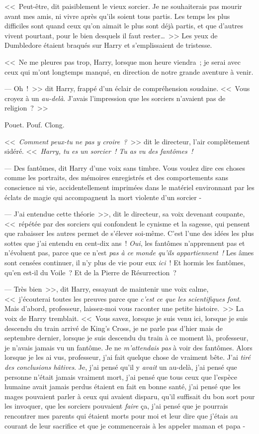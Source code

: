 <<~Peut-être, dit paisiblement le vieux sorcier. Je ne souhaiterais pas mourir avant mes amis, ni vivre après qu'ils soient tous partis. Les temps les plus difficiles sont quand ceux qu'on aimait le plus sont déjà partis, et que d'autres vivent pourtant, pour le bien desquels il faut rester…~>> Les yeux de Dumbledore étaient braqués sur Harry et s'emplissaient de tristesse.

<<~Ne me pleures pas trop, Harry, lorsque mon heure viendra~; je serai avec ceux qui m'ont longtemps manqué, en direction de notre grande aventure à venir.

--- Oh~!~>> dit Harry, frappé d'un éclair de compréhension soudaine. <<~Vous croyez à un \emph{au-delà}. J'avais l'impression que les sorciers n'avaient pas de religion~?~>>

\later

Pouet. Pouf. Clong.

<<~\emph{Comment peux-tu ne pas y croire~?}~>> dit le directeur, l'air complètement sidéré. <<~\emph{Harry, tu es un sorcier~! Tu as vu des fantômes~!}

--- Des fantômes, dit Harry d'une voix sans timbre. Vous voulez dire ces choses comme les portraits, des mémoires enregistrés et des comportements sans conscience ni vie, accidentellement imprimées dans le matériel environnant par les éclats de magie qui accompagnent la mort violente d'un sorcier -

--- J'ai entendue cette théorie~>>, dit le directeur, sa voix devenant coupante, <<~répétée par des sorciers qui confondent le cynisme et la sagesse, qui pensent que rabaisser les autres permet de s'élever soi-même. C'est l'une des idées les plus sottes que j'ai entendu en cent-dix ans~! \emph{Oui}, les fantômes n'apprennent pas et n'évoluent pas, parce que ce n'est \emph{pas à ce monde qu'ils appartiennent~!} Les âmes sont censées continuer, il n'y plus de vie pour eux \emph{ici}~! Et hormis les fantômes, qu'en est-il du Voile~? Et de la Pierre de Résurrection~?

--- Très bien~>>, dit Harry, essayant de maintenir une voix calme, <<~j'écouterai toutes les preuves parce que \emph{c'est ce que les scientifiques font}. Mais d'abord, professeur, laissez-moi vous raconter une petite histoire.~>> La voix de Harry tremblait. <<~Vous savez, lorsque je suis venu ici, lorsque je suis descendu du train arrivé de King's Cross, je ne parle pas d'hier mais de septembre dernier, lorsque je suis descendu du train à ce moment là, professeur, je n'avais jamais vu un fantôme. Je ne \emph{m'attendais pas} à voir des fantômes. Alors lorsque je les ai vus, professeur, j'ai fait quelque chose de vraiment bête. J'ai \emph{tiré des conclusions hâtives}. Je, j'ai pensé qu'il y \emph{avait} un au-delà, j'ai pensé que personne n'était jamais vraiment mort, j'ai pensé que tous ceux que l'espèce humaine avait jamais perdus étaient en fait en bonne santé, j'ai pensé que les mages pouvaient parler à ceux qui avaient disparu, qu'il suffisait du bon sort pour les invoquer, que les sorciers pouvaient \emph{faire} ça, j'ai pensé que je pourrais rencontrer mes parents qui étaient morts pour moi et leur dire que j'étais au courant de leur sacrifice et que je commencerais à les appeler maman et papa -

